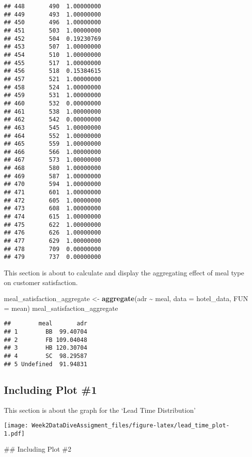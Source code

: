 \documentclass[
]{article}
\newenvironment{Shaded}{\begin{snugshade}}{\end{snugshade}}
\newcommand{\AttributeTok}[1]{\textcolor[rgb]{0.13,0.29,0.53}{#1}}
\newcommand{\FunctionTok}[1]{\textcolor[rgb]{0.13,0.29,0.53}{\textbf{#1}}}
\newcommand{\NormalTok}[1]{#1}
\newcommand{\OtherTok}[1]{\textcolor[rgb]{0.56,0.35,0.01}{#1}}
\newcommand{\SpecialCharTok}[1]{\textcolor[rgb]{0.81,0.36,0.00}{\textbf{#1}}}
\begin{document}
\begin{verbatim}
## 448       490  1.00000000
## 449       493  1.00000000
## 450       496  1.00000000
## 451       503  1.00000000
## 452       504  0.19230769
## 453       507  1.00000000
## 454       510  1.00000000
## 455       517  1.00000000
## 456       518  0.15384615
## 457       521  1.00000000
## 458       524  1.00000000
## 459       531  1.00000000
## 460       532  0.00000000
## 461       538  1.00000000
## 462       542  0.00000000
## 463       545  1.00000000
## 464       552  1.00000000
## 465       559  1.00000000
## 466       566  1.00000000
## 467       573  1.00000000
## 468       580  1.00000000
## 469       587  1.00000000
## 470       594  1.00000000
## 471       601  1.00000000
## 472       605  1.00000000
## 473       608  1.00000000
## 474       615  1.00000000
## 475       622  1.00000000
## 476       626  1.00000000
## 477       629  1.00000000
## 478       709  0.00000000
## 479       737  0.00000000
\end{verbatim}

This section is about to calculate and display the aggregating effect of
meal type on customer satisfaction.

\begin{Shaded}
\begin{Highlighting}[]
\NormalTok{meal\_satisfaction\_aggregate }\OtherTok{\textless{}{-}} \FunctionTok{aggregate}\NormalTok{(adr }\SpecialCharTok{\textasciitilde{}}\NormalTok{ meal, }\AttributeTok{data =}\NormalTok{ hotel\_data, }\AttributeTok{FUN =}\NormalTok{ mean)}
\NormalTok{meal\_satisfaction\_aggregate}
\end{Highlighting}
\end{Shaded}

\begin{verbatim}
##        meal       adr
## 1        BB  99.40704
## 2        FB 109.04048
## 3        HB 120.30704
## 4        SC  98.29587
## 5 Undefined  91.94831
\end{verbatim}

\hypertarget{including-plot-1}{%
\subsection{Including Plot \#1}\label{including-plot-1}}

This section is about the graph for the `Lead Time Distribution'

\texttt{[image: Week2DataDiveAssigment\_files/figure-latex/lead\_time\_plot-1.pdf]}

\#\# Including Plot \#2
\end{document}
